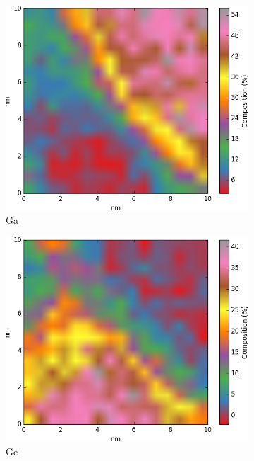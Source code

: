 \begin{figure}
\begin{subfigure}{0.45\linewidth}
		\includegraphics[width=\linewidth]{fig/q/D-E-trim/D_heatedGeKlineHEATMAP/Ga_zeta}
		\caption{Ga}
		\label{fig:Dga}
	\end{subfigure}
	\hfill
	\begin{subfigure}{0.45\textwidth}
		\includegraphics[width=\textwidth]{fig/q/D-E-trim/D_heatedGeKlineHEATMAP/Ge_zeta}
		\caption{Ge}
		\label{fig:Dge}
	\end{subfigure}%
	\hfill
	\begin{subfigure}{0.45\textwidth}

\end{subfigure}
\end{figure}

